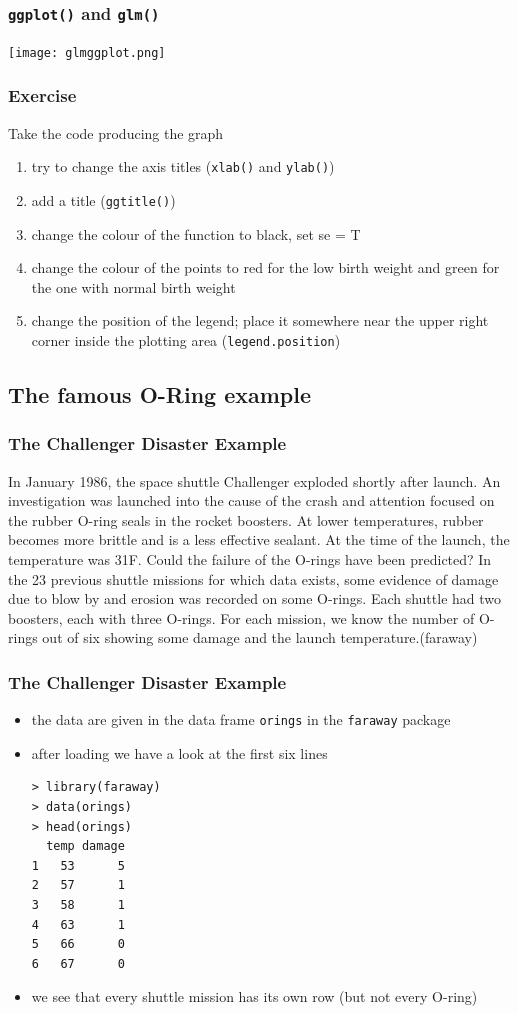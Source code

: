 \begin{frame}\frametitle{\texttt{ggplot()} and \texttt{glm()}}
  \begin{center}
    \texttt{[image: glmggplot.png]}
  \end{center}
\end{frame}


\begin{frame}[fragile]\frametitle{Exercise}
Take the code producing the graph
  \begin{enumerate}
  \item try to change the axis titles (\texttt{xlab()} and \texttt{ylab()})
  \item add a title (\texttt{ggtitle()})
  \item change the colour of the function to black, set se = T
  \item change the colour of the points to red for the low birth weight and green for the one with normal birth weight
  \item change the position of the legend; place it somewhere near the upper right corner inside the plotting area (\texttt{legend.position})
  \end{enumerate}
\end{frame}

\subsection{The famous O-Ring example}

\begin{frame}[fragile]\frametitle{The Challenger Disaster Example}
In January 1986, the space shuttle Challenger exploded shortly after launch. An
investigation was launched into the cause of the crash and attention focused on the rubber
O-ring seals in the rocket boosters. At lower temperatures, rubber becomes more brittle
and is a less effective sealant. At the time of the launch, the temperature was 31\degree F. Could
the failure of the O-rings have been predicted? In the 23 previous shuttle missions for
which data exists, some evidence of damage due to blow by and erosion was recorded on
some O-rings. Each shuttle had two boosters, each with three O-rings. For each mission,
we know the number of O-rings out of six showing some damage and the launch
temperature.(faraway)
\end{frame}

\begin{frame}[fragile]\frametitle{The Challenger Disaster Example}
\begin{itemize}
\item the data are given in the data frame \texttt{orings} in the \texttt{faraway} package
\item after loading we have a look at the first six lines
\begin{verbatim}
> library(faraway)
> data(orings)
> head(orings)
  temp damage
1   53      5
2   57      1
3   58      1
4   63      1
5   66      0
6   67      0
\end{verbatim}
\item we see that every shuttle mission has its own row (but not every O-ring)
\end{itemize}
\end{frame}

